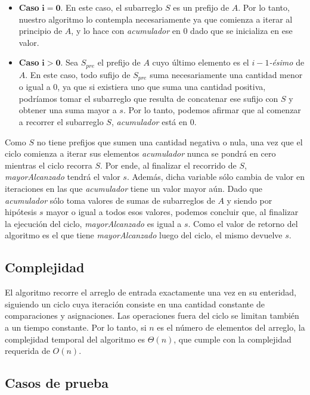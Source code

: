\begin{itemize}
    \item \textbf{Caso} $\mathbf{i = 0}$. En este caso, el subarreglo $S$ es un prefijo de $A$. Por lo tanto, nuestro algoritmo lo contempla necesariamente ya que comienza a iterar al principio de $A$, y lo hace con \textit{acumulador} en $0$ dado que se inicializa en ese valor.

    \item \textbf{Caso} $\mathbf{i > 0}$. Sea $S_{pre}$ el prefijo de $A$ cuyo último elemento es el $i-1$\textit{-ésimo} de $A$. En este caso, todo sufijo de $S_{pre}$ suma necesariamente una cantidad menor o igual a $0$, ya que si existiera uno que suma una cantidad positiva, podríamos tomar el subarreglo que resulta de concatenar ese sufijo con $S$ y obtener una suma mayor a $s$. Por lo tanto, podemos afirmar que al comenzar a recorrer el subarreglo $S$, \textit{acumulador} está en $0$.
\end{itemize}

Como $S$ no tiene prefijos que sumen una cantidad negativa o nula, una vez que el ciclo comienza a iterar sus elementos \textit{acumulador} nunca se pondrá en cero mientras el ciclo recorra $S$. Por ende, al finalizar el recorrido de $S$, \textit{mayorAlcanzado} tendrá el valor $s$. Además, dicha variable sólo cambia de valor en iteraciones en las que \textit{acumulador} tiene un valor mayor aún. Dado que \textit{acumulador} sólo toma valores de sumas de subarreglos de $A$ y siendo por hipótesis $s$ mayor o igual a todos esos valores, podemos concluir que, al finalizar la ejecución del ciclo, \textit{mayorAlcanzado} es igual a $s$. Como el valor de retorno del algoritmo es el que tiene \textit{mayorAlcanzado} luego del ciclo, el mismo devuelve $s$.

\subsection{Complejidad}

El algoritmo recorre el arreglo de entrada exactamente una vez en su enteridad, siguiendo un ciclo cuya iteración consiste en una cantidad constante de comparaciones y asignaciones. Las operaciones fuera del ciclo se limitan también a un tiempo constante. Por lo tanto, si $n$ es el número de elementos del arreglo, la complejidad temporal del algoritmo es $\Theta(n)$, que cumple con la complejidad requerida de $O(n)$.

\subsection{Casos de prueba}

